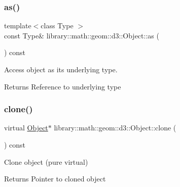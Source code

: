 \subsubsection{\texorpdfstring{as()}{as()}}
{\footnotesize\ttfamily template$<$class Type $>$ \\
const Type\& library\+::math\+::geom\+::d3\+::\+Object\+::as (\begin{DoxyParamCaption}{ }\end{DoxyParamCaption}) const\hspace{0.3cm}{\ttfamily [inline]}}



Access object as its underlying type. 

\begin{DoxyReturn}{Returns}
Reference to underlying type 
\end{DoxyReturn}
\mbox{\label{classlibrary_1_1math_1_1geom_1_1d3_1_1_object_a1a784c6b359e0eb97cd34fabc42f2f3f}} 
\subsubsection{\texorpdfstring{clone()}{clone()}}
{\footnotesize\ttfamily virtual \hyperlink{classlibrary_1_1math_1_1geom_1_1d3_1_1_object}{Object}$\ast$ library\+::math\+::geom\+::d3\+::\+Object\+::clone (\begin{DoxyParamCaption}{ }\end{DoxyParamCaption}) const\hspace{0.3cm}{\ttfamily [pure virtual]}}



Clone object (pure virtual) 

\begin{DoxyReturn}{Returns}
Pointer to cloned object 
\end{DoxyReturn}


